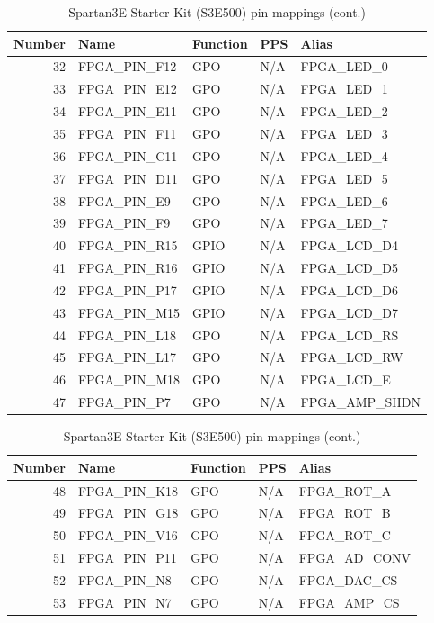 \begin{table}[H]
\begin{center}
\begin{tabularx}{14cm}{rlllX}
Number & Name & Function & PPS & Alias \\
\hline 
32 & FPGA\_PIN\_F12 & GPO & N/A & FPGA\_LED\_0 \\
33 & FPGA\_PIN\_E12 & GPO & N/A & FPGA\_LED\_1 \\
34 & FPGA\_PIN\_E11 & GPO & N/A & FPGA\_LED\_2 \\
35 & FPGA\_PIN\_F11 & GPO & N/A & FPGA\_LED\_3 \\
36 & FPGA\_PIN\_C11 & GPO & N/A & FPGA\_LED\_4 \\
37 & FPGA\_PIN\_D11 & GPO & N/A & FPGA\_LED\_5 \\
38 & FPGA\_PIN\_E9  & GPO & N/A & FPGA\_LED\_6 \\
39 & FPGA\_PIN\_F9  & GPO & N/A & FPGA\_LED\_7 \\
40 & FPGA\_PIN\_R15 & GPIO & N/A & FPGA\_LCD\_D4 \\
41 & FPGA\_PIN\_R16 & GPIO & N/A & FPGA\_LCD\_D5 \\
42 & FPGA\_PIN\_P17 & GPIO & N/A & FPGA\_LCD\_D6 \\
43 & FPGA\_PIN\_M15 & GPIO & N/A & FPGA\_LCD\_D7 \\
44 & FPGA\_PIN\_L18 & GPO & N/A & FPGA\_LCD\_RS \\
45 & FPGA\_PIN\_L17 & GPO & N/A & FPGA\_LCD\_RW \\
46 & FPGA\_PIN\_M18 & GPO & N/A & FPGA\_LCD\_E \\
47 & FPGA\_PIN\_P7  & GPO & N/A & FPGA\_AMP\_SHDN
\end{tabularx}
\caption{Spartan3E Starter Kit (S3E500) pin mappings (cont.)}
\end{center}
\end{table}


\begin{table}[H]
\begin{center}
\begin{tabularx}{14cm}{rlllX}
Number & Name & Function & PPS & Alias \\
\hline
48 & FPGA\_PIN\_K18 & GPO & N/A & FPGA\_ROT\_A \\
49 & FPGA\_PIN\_G18 & GPO & N/A & FPGA\_ROT\_B \\
50 & FPGA\_PIN\_V16 & GPO & N/A & FPGA\_ROT\_C \\
51 & FPGA\_PIN\_P11 & GPO & N/A & FPGA\_AD\_CONV \\
52 & FPGA\_PIN\_N8 & GPO & N/A & FPGA\_DAC\_CS \\
53 & FPGA\_PIN\_N7 & GPO & N/A & FPGA\_AMP\_CS
\end{tabularx}
\caption{Spartan3E Starter Kit (S3E500) pin mappings (cont.)}
\end{center}
\end{table}


